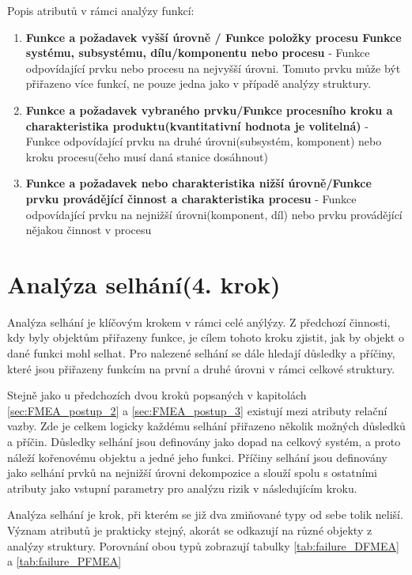 Popis atributů v rámci analýzy funkcí:
\begin{enumerate}
	\item \textbf{Funkce a požadavek vyšší úrovně / Funkce položky procesu Funkce systému, subsystému, dílu/komponentu nebo procesu} - Funkce odpovídající prvku nebo procesu na nejvyšší úrovni. Tomuto prvku může být přiřazeno více funkcí, ne pouze jedna jako v případě analýzy struktury.
	\item \textbf{Funkce a požadavek vybraného prvku/Funkce procesního kroku a charakteristika produktu(kvantitativní hodnota je volitelná)} - Funkce odpovídající prvku na druhé úrovni(subsystém, komponent) nebo kroku procesu(čeho musí daná stanice dosáhnout)
	\item \textbf{Funkce a požadavek nebo charakteristika nižší úrovně/Funkce prvku provádějící činnost a charakteristika procesu} - Funkce odpovídající prvku na nejnižší úrovni(komponent, díl) nebo prvku provádějící nějakou činnost v procesu
\end{enumerate}



\section{Analýza selhání(4. krok)}
Analýza selhání je klíčovým krokem v rámci celé anýlýzy. Z předchozí činnosti, kdy byly objektům přiřazeny funkce, je cílem tohoto kroku zjistit, jak by objekt o dané funkci mohl selhat. Pro nalezené selhání se dále hledají důsledky a příčiny, které jsou přiřazeny funkcím na první a druhé úrovni v rámci celkové struktury. 

Stejně jako u předchozích dvou kroků popsaných v kapitolách \ref{sec:FMEA_postup_2} a \ref{sec:FMEA_postup_3} existují mezi atributy relační vazby. Zde je celkem logicky každému selhání přiřazeno několik možných důsledků a příčin. Důsledky selhání jsou definovány jako dopad na celkový systém, a proto náleží kořenovému objektu a jedné jeho funkci. Příčiny selhání jsou definovány jako selhání prvků na nejnižší úrovni dekompozice a slouží spolu s ostatními atributy jako vstupní parametry pro analýzu rizik v následujícím kroku.

Analýza selhání je krok, při kterém se již dva zmiňované typy od sebe tolik neliší. Význam atributů je prakticky stejný, akorát se odkazují na různé objekty z analýzy struktury. Porovnání obou typů zobrazují tabulky \ref{tab:failure_DFMEA} a \ref{tab:failure_PFMEA}


